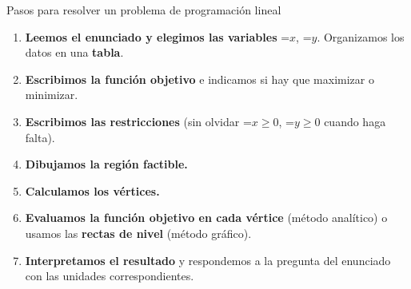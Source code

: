 \documentclass[11pt,a4paper]{article}
\newcommand{\fmm}[1]{\setbox0=\hbox{$#1$}\ifdim\wd0>\linewidth\fmdisp{#1}\else\mbox{\box0}\fi}
\newcommand{\fmdisp}[1]{\[\setbox2=\hbox{$\displaystyle #1$}\ifdim\wd2>\linewidth\resizebox{\linewidth}{!}{\box2}\else\box2\fi\]}
\begin{document}
\begin{fmdef}{Pasos para resolver un problema de programación lineal}
\begin{enumerate}
\item \textbf{Leemos el enunciado y elegimos las variables} \fmm{x}, \fmm{y}. Organizamos los datos en una \textbf{tabla}.
\item \textbf{Escribimos la función objetivo} e indicamos si hay que maximizar o minimizar.
\item \textbf{Escribimos las restricciones} (sin olvidar \fmm{x\geq0}, \fmm{y\geq0} cuando haga falta).
\item \textbf{Dibujamos la región factible.}
\item \textbf{Calculamos los vértices.}
\item \textbf{Evaluamos la función objetivo en cada vértice} (método analítico) o usamos las \textbf{rectas de nivel} (método gráfico).
\item \textbf{Interpretamos el resultado} y respondemos a la pregunta del enunciado con las unidades correspondientes.
\end{enumerate}
\end{fmdef}
\end{document}
